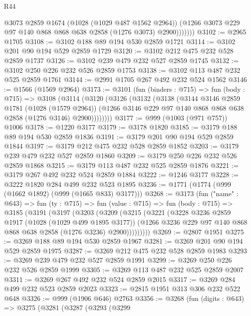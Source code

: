 \begin{lexlean}{R44}
\begin{coremodule}
                @3073
                @2859
                @1674
                (@1028 (@1029 @487 @1562 @2964))
                (@1266 @3073 @229 @97 @140 @868 @868 @638 @2858 (@1276 @3073) @2900)))))))
@3102 := @2965 @1705
@3108 := @3102 @188 @89 @194 @530 @2859 @1721
@3114 := @3102 @201 @90 @194 @529 @2859 @1729
@3120 := @3102 @212 @475 @232 @528 @2859 @1737
@3126 := @3102 @239 @479 @232 @527 @2859 @1745
@3132 := @3102 @250 @226 @232 @526 @2859 @1753
@3138 := @3102 @113 @487 @232 @525 @2859 @1761
@3144 := @2991 @1705 @267 @492 @232 @524 @1562
@3146 := @1566 (@1569 @2964)
@3173 := @3101
    (fun (binders : @715) =>
    fun (body : @715) =>
    @3108
      (@3114
        (@3120
          (@3126
            (@3132
              (@3138
                (@3144
                  @3146
                  @2859
                  @1781
                  (@1028 (@1579 @2964))
                  (@1266 @3146 @229 @97 @140 @868 @868 @638 @2858 (@1276 @3146) @2900))))))))
@3177 := @999 (@1003 (@971 @757)) @1006
@3178 := @1220 @3177
@3179 := @3178 @1820
@3185 := @3179 @188 @89 @194 @530 @2859 @1836
@3191 := @3179 @201 @90 @194 @529 @2859 @1844
@3197 := @3179 @212 @475 @232 @528 @2859 @1852
@3203 := @3179 @239 @479 @232 @527 @2859 @1860
@3209 := @3179 @250 @226 @232 @526 @2859 @1868
@3215 := @3179 @113 @487 @232 @525 @2859 @1876
@3221 := @3179 @267 @492 @232 @524 @2859 @1884
@3222 := @1246 @3177
@3228 := @3222 @1820 @284 @499 @232 @523 @1895
@3236 := @1771 (@1774 (@999 (@1662 @1892) (@999 (@1665 @833) @3177)))
@3268 := @3173
    (fun ("name" : @643) =>
    fun (ty : @715) =>
    fun (value : @715) =>
    fun (body : @715) =>
    @3185
      (@3191
        (@3197
          (@3203
            (@3209
              (@3215
                (@3221
                  (@3228
                    @3236
                    @2859
                    @1917
                    (@1028 (@1029 @499 @1895 @3177))
                    (@1266 @3236 @229 @97 @140 @868 @868 @638 @2858 (@1276 @3236) @2900)))))))))
@3269 := @2807 @1951
@3275 := @3269 @188 @89 @194 @530 @2859 @1967
@3281 := @3269 @201 @90 @194 @529 @2859 @1975
@3287 := @3269 @212 @475 @232 @528 @2859 @1983
@3293 := @3269 @239 @479 @232 @527 @2859 @1991
@3299 := @3269 @250 @226 @232 @526 @2859 @1999
@3305 := @3269 @113 @487 @232 @525 @2859 @2007
@3311 := @3269 @267 @492 @232 @524 @2859 @2015
@3317 := @3269 @284 @499 @232 @523 @2859 @2023
@3323 := @2815 @1951 @313 @306 @232 @522 @648
@3326 := @999 (@1906 @646) @2763
@3356 := @3268
    (fun (digits : @643) =>
    @3275
      (@3281
        (@3287
          (@3293
            (@3299

\end{coremodule}
\end{lexlean}
